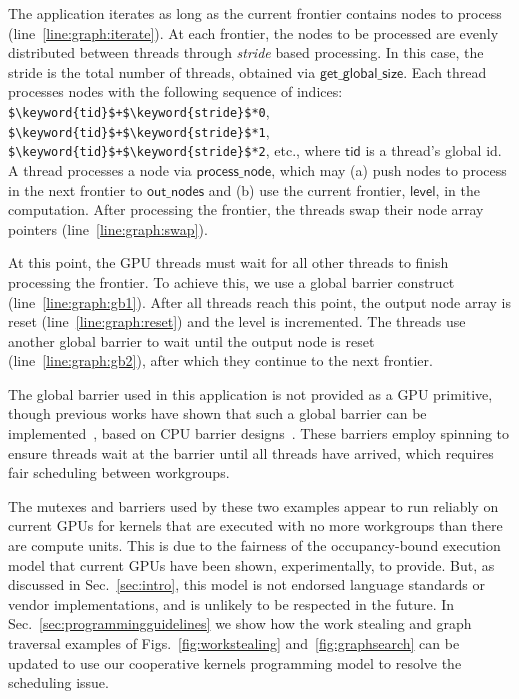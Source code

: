 \documentclass[parskip=half,sigconf,review, anonymous=true, acmcopyrightmode=none]{acmart}
\newcommand{\myfigs}{Figs.~}
\newcommand{\mysec}{Sec.~}
\newcommand{\code}[1]{\lstset{basicstyle=\tt}\lstinline!#1!\lstset{basicstyle=\scriptsize\tt}}
\newcommand{\getglobalsize}{\mathsf{get\_global\_size}}
\newcommand{\keyword}[1]{\mathsf{#1}}
\begin{document}
The application iterates as long as the current frontier contains
nodes to process (line~\ref{line:graph:iterate}). At each frontier,
the nodes to be processed are evenly distributed between
threads through \emph{stride} based processing.
%
In this case, the stride is the total number of threads, obtained via
$\getglobalsize$.  Each thread processes nodes with the following sequence of indices:
\code{$\keyword{tid}$+$\keyword{stride}$*0},
\code{$\keyword{tid}$+$\keyword{stride}$*1},
\code{$\keyword{tid}$+$\keyword{stride}$*2}, etc., where $\keyword{tid}$ is a thread's global id.
A thread processes a node via $\keyword{process\_node}$, which may (a) push nodes to process in the next frontier to
$\keyword{out\_nodes}$ and (b) use the current frontier, $\keyword{level}$, in
the computation. After processing the frontier, the threads swap their
node array pointers (line~\ref{line:graph:swap}).

At this point, the GPU threads must wait for all other threads to
finish processing the frontier. To achieve
this, we use a global barrier construct
(line~\ref{line:graph:gb1}). After all threads reach this point, the
output node array is reset (line~\ref{line:graph:reset}) and the level
is incremented. The threads use another global barrier to wait until the output node is
reset (line~\ref{line:graph:gb2}), after which they continue to the next frontier.

The global barrier used in this application is not provided as a GPU
primitive, though previous works have shown that such a global
barrier can be implemented~\cite{XF10,DBLP:conf/oopsla/SorensenDBGR16},
based on CPU barrier designs~\cite[ch. 17]{HS08}.
 These barriers employ spinning to ensure threads wait at the barrier until all
threads have arrived, which requires fair
scheduling between workgroups.%

The mutexes and barriers used by these two examples appear to run
reliably on current GPUs for kernels that are executed with no more
workgroups than there are compute units.  This is due to the fairness
of the occupancy-bound execution model that current GPUs have been
shown, experimentally, to provide.  But, as discussed in
\mysec\ref{sec:intro}, this model is not endorsed
language standards or vendor implementations, and is unlikely to be respected in the future.
%
In \mysec\ref{sec:programmingguidelines} we show how the work stealing
and graph traversal examples of \myfigs\ref{fig:workstealing} and~\ref{fig:graphsearch} can be
updated to use our cooperative kernels programming model to resolve
the scheduling issue.
\end{document}
